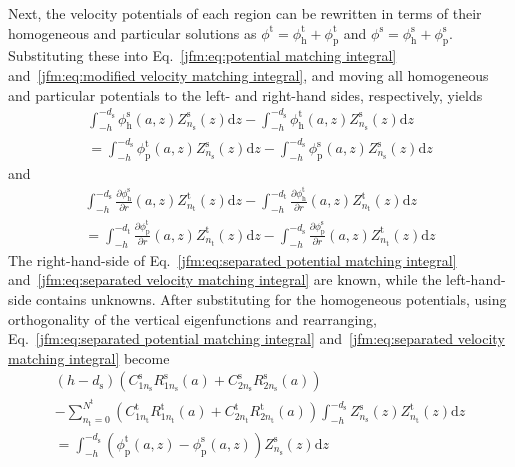 Next, the velocity potentials of each region can be rewritten in terms of their homogeneous and particular solutions as $\phi^\mathrm{t}=\phi^\mathrm{t}_\mathrm{h} + \phi^\mathrm{t}_\mathrm{p}$ and $\phi^\mathrm{s}=\phi^\mathrm{s}_\mathrm{h} + \phi^\mathrm{s}_\mathrm{p}$. Substituting these into Eq.~\ref{jfm:eq:potential matching integral} and~\ref{jfm:eq:modified velocity matching integral}, and moving all homogeneous and particular potentials to the left- and right-hand sides, respectively, yields
\begin{multline}\label{jfm:eq:separated potential matching integral}
    \int_{-h}^{-d_\mathrm{s}} \phi^\mathrm{s}_\mathrm{h}(a,z) Z^\mathrm{s}_{n_\mathrm{s}}(z) \mathrm{d}z-\int_{-h}^{-d_\mathrm{s}} \phi^\mathrm{t}_\mathrm{h}(a,z) Z^\mathrm{s}_{n_\mathrm{s}}(z) \mathrm{d}z \\
    =\int_{-h}^{-d_\mathrm{s}}\phi^\mathrm{t}_\mathrm{p}(a,z) Z^\mathrm{s}_{n_\mathrm{s}}(z) \mathrm{d}z-\int_{-h}^{-d_\mathrm{s}}\phi^\mathrm{s}_\mathrm{p}(a,z) Z^\mathrm{s}_{n_\mathrm{s}}(z) \mathrm{d}z
\end{multline}
and
\begin{multline}\label{jfm:eq:separated velocity matching integral}
    \int_{-h}^{-d_\mathrm{s}} \frac{\partial \phi^\mathrm{s}_\mathrm{h}}{\partial r}(a,z)  Z^\mathrm{t}_{n_\mathrm{t}}(z) \mathrm{d}z-\int_{-h}^{-d_\mathrm{t}} \frac{\partial \phi_\mathrm{h}^\mathrm{t}}{\partial r}(a,z) Z^\mathrm{t}_{n_\mathrm{t}}(z) \mathrm{d}z \\ 
    =\int_{-h}^{-d_\mathrm{t}}\frac{\partial \phi_\mathrm{p}^\mathrm{t}}{\partial r}(a,z) Z^\mathrm{t}_{n_\mathrm{t}}(z) \mathrm{d}z-\int_{-h}^{-d_\mathrm{s}}\frac{\partial \phi_\mathrm{p}^\mathrm{s}}{\partial r}(a,z) Z^\mathrm{t}_{n_\mathrm{t}}(z) \mathrm{d}z
\end{multline}
The right-hand-side of Eq.~\ref{jfm:eq:separated potential matching integral} and~\ref{jfm:eq:separated velocity matching integral} are known, while the left-hand-side contains unknowns. After substituting for the homogeneous potentials, using orthogonality of the vertical eigenfunctions and rearranging, Eq.~\ref{jfm:eq:separated potential matching integral} and~\ref{jfm:eq:separated velocity matching integral} become
\begin{multline}\label{jfm:eq:separated potential matching integral simplified}
    (h-d_\mathrm{s}) \left( C^\mathrm{s}_{1n_\mathrm{s}} R_{1n_\mathrm{s}}^\mathrm{s} (a)+ C^\mathrm{s}_{2n_\mathrm{s}} R_{2n_\mathrm{s}}^\mathrm{s}(a) \right) \\ 
    -\sum _{n_\mathrm{t} = 0}^{N^\mathrm{t}} \left(C^\mathrm{t}_{1n_\mathrm{t}} R_{1n_\mathrm{t}}^\mathrm{t}(a)+ C^\mathrm{t}_{2n_\mathrm{t}} R_{2n_\mathrm{t}}^\mathrm{t}(a) \right)\int_{-h}^{-d_\mathrm{s}} Z^\mathrm{s}_{n_\mathrm{s}}(z) Z_{n_\mathrm{t}}^\mathrm{t}(z)\mathrm{d}z \\ 
    =\int_{-h}^{-d_\mathrm{s}}\left( \phi_\mathrm{p}^\mathrm{t}(a,z) - \phi_\mathrm{p}^\mathrm{s}(a,z) \right) Z^\mathrm{s}_{n_\mathrm{s}}(z) \mathrm{d}z
\end{multline}
